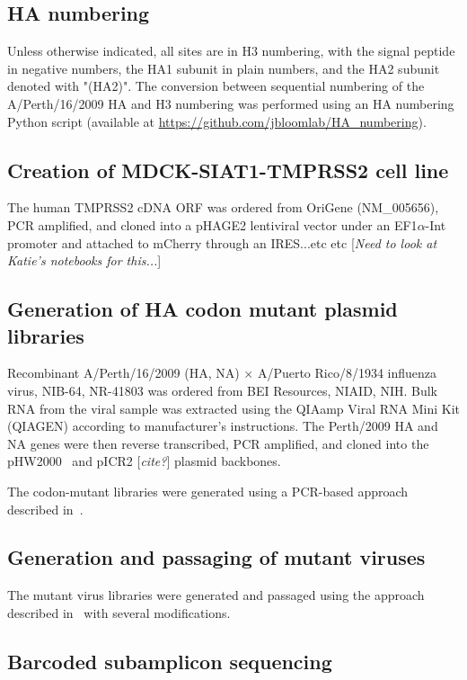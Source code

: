 \documentclass[11pt]{article}
\newcommand{\comment}[1]{{\color{red}[\textsl{#1}]}}
\begin{document}
\subsection*{HA numbering}
Unless otherwise indicated, all sites are in H3 numbering, with the signal peptide in negative numbers, the HA1 subunit in plain numbers, and the HA2 subunit denoted with "(HA2)". The conversion between sequential numbering of the A/Perth/16/2009 HA and H3 numbering was performed using an HA numbering Python script (available at \url{https://github.com/jbloomlab/HA_numbering}).

\subsection*{Creation of MDCK-SIAT1-TMPRSS2 cell line}
The human TMPRSS2 cDNA ORF was ordered from OriGene (NM\_005656), PCR amplified, and cloned into a pHAGE2 lentiviral vector under an EF1$\alpha$-Int promoter and attached to mCherry through an IRES...etc etc
\comment{Need to look at Katie's notebooks for this...}

\subsection*{Generation of HA codon mutant plasmid libraries}
Recombinant A/Perth/16/2009 (HA, NA) $\times$ A/Puerto Rico/8/1934 influenza virus, NIB-64, NR-41803 was ordered from BEI Resources, NIAID, NIH. 
Bulk RNA from the viral sample was extracted using the QIAamp Viral RNA Mini Kit (QIAGEN) according to manufacturer's instructions.
The Perth/2009 HA and NA genes were then reverse transcribed, PCR amplified, and cloned into the pHW2000~\citep{hoffmann2000dna} and pICR2 \comment{cite?} plasmid backbones.

The codon-mutant libraries were generated using a PCR-based approach described in~\cite{dingens2017comprehensive}.

\subsection*{Generation and passaging of mutant viruses}
The mutant virus libraries were generated and passaged using the approach described in~\cite{doud2016accurate} with several modifications.

\subsection*{Barcoded subamplicon sequencing}
\end{document}
